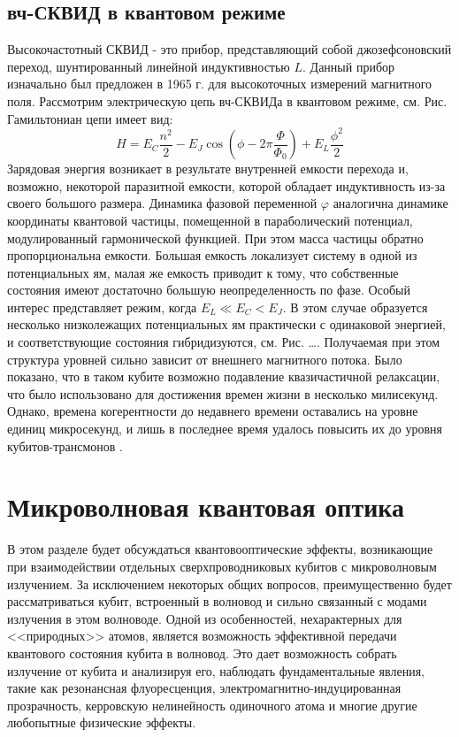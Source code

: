 \subsection{вч-СКВИД в квантовом режиме}
Высокочастотный СКВИД - это прибор, представляющий собой джозефсоновский переход, шунтированный линейной индуктивностью $L$. Данный прибор изначально был предложен в 1965 г. для высокоточных измерений магнитного поля. Рассмотрим электрическую цепь вч-СКВИДа в квантовом режиме, см. Рис. Гамильтониан цепи имеет вид:
\begin{equation}
H = E_C \frac{n^2}{2} - E_J\cos(\phi - 2\pi\frac{\Phi}{\Phi_0}) + E_L\frac{\phi^2}{2}
\label{eq: rf_squid_ham}
\end{equation}
Зарядовая энергия возникает в результате внутренней емкости перехода и, возможно, некоторой паразитной емкости, которой обладает индуктивность из-за своего большого размера.
Динамика фазовой переменной $\varphi$ аналогична динамике координаты квантовой частицы, помещенной в параболический потенциал, модулированный гармонической функцией. При этом масса частицы обратно пропорциональна емкости. Большая емкость локализует систему в одной из потенциальных ям, малая же емкость приводит к тому, что собственные состояния имеют достаточно большую неопределенность по фазе. Особый интерес представляет режим, когда $E_L \ll E_C < E_J$. В этом случае образуется несколько низколежащих потенциальных ям практически с одинаковой энергией, и соответствующие состояния гибридизуются, см. Рис. \ldots. Получаемая при этом структура уровней сильно зависит от внешнего магнитного потока. Было показано, что в таком кубите возможно подавление квазичастичной релаксации, что было использовано для достижения времен жизни в несколько милисекунд. Однако, времена когерентности до недавнего времени оставались на уровне единиц микросекунд, и лишь в последнее время удалось повысить их до уровня кубитов-трансмонов \cite{grunhaupt2019granular}. 
\section{Микроволновая квантовая оптика}
\label{sec: microwave qo}

В этом разделе будет обсуждаться квантовооптические эффекты, возникающие при взаимодействии отдельных сверхпроводниковых кубитов с микроволновым излучением. За исключением некоторых общих вопросов, преимущественно будет рассматриваться кубит, встроенный в волновод и сильно связанный с модами излучения в этом волноводе. Одной из особенностей, нехарактерных для <<природных>> атомов, является возможность эффективной передачи квантового состояния кубита в волновод. Это дает возможность собрать излучение от кубита и анализируя его, наблюдать фундаментальные явления, такие как резонансная флуоресценция, электромагнитно-индуцированная прозрачность, керровскую нелинейность одиночного атома и многие другие любопытные физические эффекты. 
